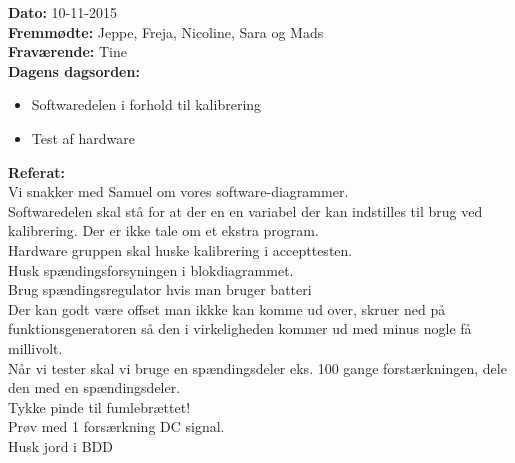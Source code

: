 \textbf{Dato:} 10-11-2015\\

\textbf{Fremmødte:} Jeppe, Freja, Nicoline, Sara og Mads\\

\textbf{Fraværende:} Tine\\

\textbf{Dagens dagsorden:}
\begin{itemize}
	\item Softwaredelen i forhold til kalibrering 
	\item Test af hardware
\end{itemize}

\textbf{Referat:}\\
Vi snakker med Samuel om vores software-diagrammer.\\
Softwaredelen skal stå for at der en en variabel der kan indstilles til brug ved kalibrering. Der er ikke tale 
om et ekstra program.\\
Hardware gruppen skal huske kalibrering i accepttesten.\\
Husk spændingsforsyningen i blokdiagrammet.\\
Brug spændingsregulator hvis man bruger batteri\\
Der kan godt være offset man ikkke kan komme ud over, skruer ned på funktionsgeneratoren så den i virkeligheden kommer ud med minus nogle få millivolt.\\
Når vi tester skal vi bruge en spændingsdeler eks. 100 gange forstærkningen, dele den med en spændingsdeler.\\
Tykke pinde til fumlebrættet!\\
Prøv med 1 forsærkning DC signal.\\ 
Husk jord i BDD\\
